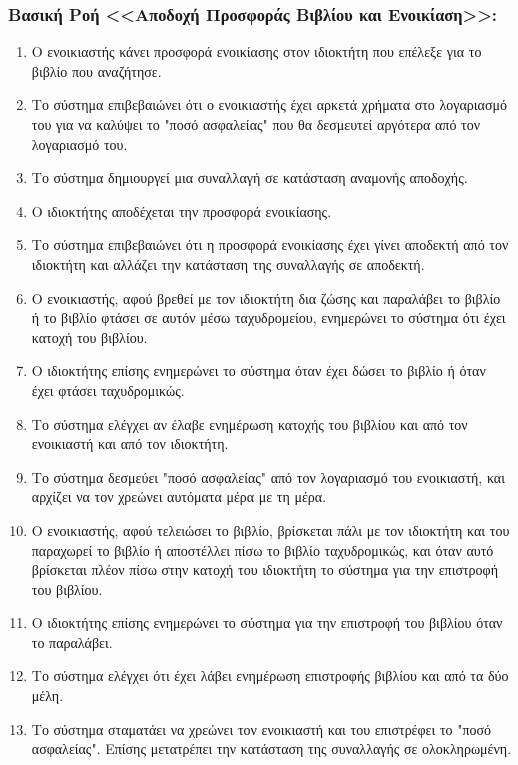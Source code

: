 \documentclass[12pt,a4paper]{article}
\begin{document}
\subsubsection*{Βασική Ροή <<Αποδοχή Προσφοράς Βιβλίου και Ενοικίαση>>:}
\begin{enumerate}
    \item Ο ενοικιαστής κάνει προσφορά ενοικίασης στον ιδιοκτήτη που επέλεξε για το βιβλίο που αναζήτησε.
        \label{Επιλογή τρόπου συναλλαγής}
    \item Το σύστημα επιβεβαιώνει ότι ο ενοικιαστής έχει αρκετά χρήματα στο λογαριασμό του για να καλύψει το "ποσό ασφαλείας" που θα δεσμευτεί αργότερα από τον λογαριασμό του.
        \label{Έλεγχος ποσού ασφαλείας}
    \item Το σύστημα δημιουργεί μια συναλλαγή σε κατάσταση αναμονής αποδοχής.
    \item Ο ιδιοκτήτης αποδέχεται την προσφορά ενοικίασης.
    \item Το σύστημα επιβεβαιώνει ότι η προσφορά ενοικίασης έχει γίνει αποδεκτή από τον ιδιοκτήτη και αλλάζει την κατάσταση της συναλλαγής σε αποδεκτή.
        \label{Αποδοχή ή απόρριψη συναλλαγής}
    \item Ο ενοικιαστής, αφού βρεθεί με τον ιδιοκτήτη δια ζώσης και παραλάβει το βιβλίο ή το βιβλίο φτάσει σε αυτόν μέσω ταχυδρομείου, ενημερώνει το σύστημα ότι έχει κατοχή του βιβλίου. 
    \item Ο ιδιοκτήτης επίσης ενημερώνει το σύστημα όταν έχει δώσει το βιβλίο ή όταν έχει φτάσει ταχυδρομικώς.
    \item Το σύστημα ελέγχει αν έλαβε ενημέρωση κατοχής του βιβλίου και από τον ενοικιαστή και από τον ιδιοκτήτη.
        \label {Δεν ενημερώνεται η κατοχή}
    \item Το σύστημα δεσμεύει "ποσό ασφαλείας" από τον λογαριασμό του ενοικιαστή, και αρχίζει να τον χρεώνει αυτόματα μέρα με τη μέρα.
        \label{Τέλος dispute resolved - Τέλος χρημάτων}
    \item Ο ενοικιαστής, αφού τελειώσει το βιβλίο, βρίσκεται πάλι με τον ιδιοκτήτη και του παραχωρεί το βιβλίο ή αποστέλλει πίσω το βιβλίο ταχυδρομικώς, και όταν αυτό βρίσκεται πλέον πίσω στην κατοχή του ιδιοκτήτη το σύστημα για την επιστροφή του βιβλίου.
    \item Ο ιδιοκτήτης επίσης ενημερώνει το σύστημα για την επιστροφή του βιβλίου όταν το παραλάβει.
        \label{Επιστροφή βιβλίου - Τέλος λεφτά δεν φτάνουν}
    \item Το σύστημα ελέγχει ότι έχει λάβει ενημέρωση επιστροφής βιβλίου και από τα δύο μέλη. 
    \item Το σύστημα σταματάει να χρεώνει τον ενοικιαστή και του επιστρέφει το "ποσό ασφαλείας". Επίσης μετατρέπει την κατάσταση της συναλλαγής σε ολοκληρωμένη.
        \label{Τέλος ενοικίασης}
\end{enumerate}
\end{document}
